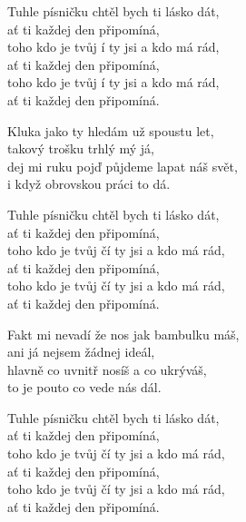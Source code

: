 
\cho{}
Tuhle písničku chtěl bych ti lásko dát,\\
ať ti každej den připomíná,\\
toho kdo je tvůj í ty jsi a kdo má rád,\\
ať ti každej den připomíná,\\
toho kdo je tvůj í ty jsi a kdo má rád,\\
ať ti každej den \ch{}připomíná.

\ve
Kluka jako ty hledám už spoustu let,\\
takový trošku trhlý mý já,\\
dej mi ruku pojď půjdeme lapat náš svět,\\
i když obrovskou práci to dá.

\cho{}
Tuhle písničku chtěl bych ti lásko dát,\\
ať ti každej den připomíná,\\
toho kdo je tvůj čí ty jsi a kdo má rád,\\
ať ti každej den připomíná,\\
toho kdo je tvůj čí ty jsi a kdo má rád,\\
ať ti každej den připomíná.

\ve
Fakt mi nevadí že nos jak bambulku máš,\\
ani já nejsem žádnej ideál,\\
hlavně co uvnitř nosíš a co ukrýváš,\\
to je pouto co vede nás dál.

\cho{}
Tuhle písničku chtěl bych ti lásko dát,\\
ať ti každej den připomíná,\\
toho kdo je tvůj čí ty jsi a kdo má rád,\\
ať ti každej den připomíná,\\
toho kdo je tvůj čí ty jsi a kdo má rád,\\
ať ti každej den připomíná.

\esong